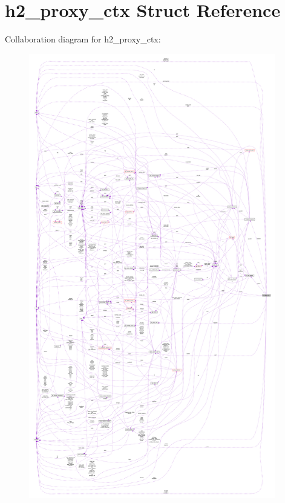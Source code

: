 \hypertarget{structh2__proxy__ctx}{}\section{h2\+\_\+proxy\+\_\+ctx Struct Reference}
\label{structh2__proxy__ctx}


Collaboration diagram for h2\+\_\+proxy\+\_\+ctx\+:
\nopagebreak
\begin{figure}[H]
\begin{center}
\leavevmode
\includegraphics[height=550pt]{structh2__proxy__ctx__coll__graph}
\end{center}
\end{figure}
